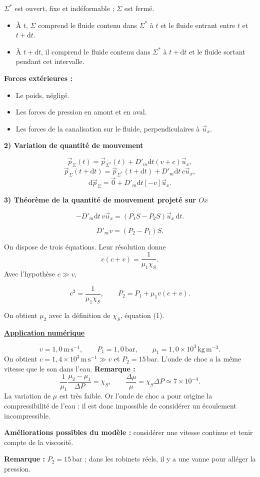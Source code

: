 \documentclass[11pt,a4paper]{article}
\newcommand{\dd}{\mathrm d}
\newcommand{\ux}{\vec u_x}\newcommand{\uy}{\vec u_y}\newcommand{\uz}{\vec u_z}
\newcommand{\titr}[1]{\par\textbf{\underline{#1}}\par\nopagebreak[3]}
\newcommand{\sys}{\Sigma^*}
\newcommand{\etape}[1]{\par\medskip\textbf{#1}\par\nopagebreak[4]}
\begin{document}
$\sys$ est ouvert, fixe et indéformable ; $\Sigma$ est fermé.
\begin{itemize}\item À $t$, $\Sigma$ comprend le fluide contenu dans $\sys$ à $t$ et le fluide entrant entre $t$ et $t+\dd t$.
\item À $t+\dd t$, il comprend le fluide contenu dans $\sys$ à $t+\dd t$ et le fluide sortant pendant cet intervalle.\end{itemize}
\par\par\par\medskip\noindent\begin{minipage}{\linewidth}
\textbf{Forces extérieures :}
\begin{itemize}
\item Le poids, négligé.
\item Les forces de pression en amont et en aval.
\item Les forces de la canalisation sur le fluide, perpendiculaires à $\ux$.
\end{itemize}
\end{minipage}\par
\etape{2) Variation de quantité de mouvement}
\[\vec p_\Sigma(t)=\vec p_{\sys}(t)+D'_m\dd t(v+c)\ux,\]
\[\vec p_\Sigma(t+\dd t)=\vec p_{\sys}(t+\dd t)+D'_m\dd t\,c\ux,\]
\[\dd\vec p_\Sigma=\vec0+D'_m\dd t[-v]\ux.\]
\etape{3) Théorème de la quantité de mouvement projeté sur $Ox$}
\[-D'_m\dd t\,v\ux=(P_1S-P_2S)\ux\,\dd t.\]
\begin{cadre}\[D'_m v=(P_2-P_1)S.\tag{3}\]\end{cadre}
On dispose de trois équations. Leur résolution donne
\[c(c+v)=\frac1{\mu_1\chi_S}.\]
Avec l'hypothèse $c\gg v$,
\begin{cadre}\[c^2=\frac1{\mu_1\chi_S},\qquad P_2=P_1+\mu_1v(c+v).\]\end{cadre}
On obtient $\mu_2$ avec la définition de $\chi_S$, équation (1).
\titr{Application numérique}
\[v=1{,}0\,\mathrm{m\,s^{-1}},\qquad P_1=1{,}0\,\mathrm{bar},\qquad\mu_1=1{,}0\times10^3\,\mathrm{kg\,m^{-3}}.\]
On obtient $c=1{,}4\times10^3\,\mathrm{m\,s^{-1}}\gg v$ et $P_2=15\,\mathrm{bar}$.
L'onde de choc a la même vitesse que le son dans l'eau.
\textbf{Remarque :}
\[\frac1{\mu_1}\frac{\mu_2-\mu_1}{\Delta P}=\chi_S,\qquad\frac{\Delta\mu}{\mu}=\chi_S\Delta P\simeq7\times10^{-4}.\]
La variation de $\mu$ est très faible. Or l'onde de choc a pour origine la compressibilité de l'eau : il est donc impossible de considérer un écoulement incompressible.
\par\textbf{Améliorations possibles du modèle :} considérer une vitesse continue et tenir compte de la viscosité.
\par\textbf{Remarque :} $P_2=15\,\mathrm{bar}$ ; dans les robinets réels, il y a une vanne pour alléger la pression.
\clearpage
\end{document}
